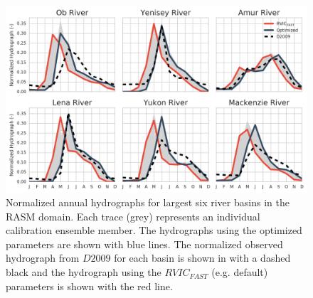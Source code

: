 \documentclass[jgrga, draft]{agutex}
\begin{document}
\clearpage
\begin{figure}
\noindent\includegraphics[width=35pc,natwidth=1]{calibration_hydrographs}
\caption{Normalized annual hydrographs for largest six river basins in the RASM domain.
Each trace (grey) represents an individual calibration ensemble member.
The hydrographs using the optimized parameters are shown with blue lines.
The normalized observed hydrograph from $D2009$ for each basin is shown in with a dashed black and the hydrograph using the $RVIC_{FAST}$ (e.g. default) parameters is shown with the red line.}
\label{fig:calibration_hydrographs}
\end{figure}
\end{document}
